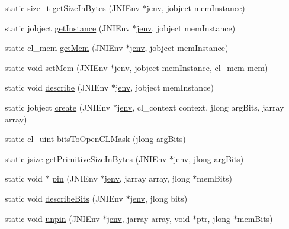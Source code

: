 \begin{DoxyCompactItemize}
\item 
static size\-\_\-t \hyperlink{class_open_c_l_mem_adf381fcc1d6d7bcf70ae8ef6ee6f7ce5}{get\-Size\-In\-Bytes} (J\-N\-I\-Env $\ast$\hyperlink{aparapi_8cpp_a31595c73e9a3750524b2ff61b5a14f96}{jenv}, jobject mem\-Instance)
\item 
static jobject \hyperlink{class_open_c_l_mem_a88763f264e09448e489865cc53492275}{get\-Instance} (J\-N\-I\-Env $\ast$\hyperlink{aparapi_8cpp_a31595c73e9a3750524b2ff61b5a14f96}{jenv}, jobject mem\-Instance)
\item 
static cl\-\_\-mem \hyperlink{class_open_c_l_mem_a1283fd523c4a944177fe61cb77d8e1c8}{get\-Mem} (J\-N\-I\-Env $\ast$\hyperlink{aparapi_8cpp_a31595c73e9a3750524b2ff61b5a14f96}{jenv}, jobject mem\-Instance)
\item 
static void \hyperlink{class_open_c_l_mem_a9fb43093c396d67bcbadbcb3d32fdb62}{set\-Mem} (J\-N\-I\-Env $\ast$\hyperlink{aparapi_8cpp_a31595c73e9a3750524b2ff61b5a14f96}{jenv}, jobject mem\-Instance, cl\-\_\-mem \hyperlink{_java_args_8h_a7cbda7d5df70386b14562f4b9ce490a8}{mem})
\item 
static void \hyperlink{class_open_c_l_mem_ac9d47eddfd8a064ae190b2c1fb3991e3}{describe} (J\-N\-I\-Env $\ast$\hyperlink{aparapi_8cpp_a31595c73e9a3750524b2ff61b5a14f96}{jenv}, jobject mem\-Instance)
\item 
static jobject \hyperlink{class_open_c_l_mem_adad92d2ccc634bed1b32a4f97052567e}{create} (J\-N\-I\-Env $\ast$\hyperlink{aparapi_8cpp_a31595c73e9a3750524b2ff61b5a14f96}{jenv}, cl\-\_\-context context, jlong arg\-Bits, jarray array)
\item 
static cl\-\_\-uint \hyperlink{class_open_c_l_mem_ac500dbd77f97d7a080c763b8d00addf4}{bits\-To\-Open\-C\-L\-Mask} (jlong arg\-Bits)
\item 
static jsize \hyperlink{class_open_c_l_mem_a0ce7d742f4e68b4bb5b77eb26c4f2ed3}{get\-Primitive\-Size\-In\-Bytes} (J\-N\-I\-Env $\ast$\hyperlink{aparapi_8cpp_a31595c73e9a3750524b2ff61b5a14f96}{jenv}, jlong arg\-Bits)
\item 
static void $\ast$ \hyperlink{class_open_c_l_mem_af6a8f1168e1cc1e590d90953950993f6}{pin} (J\-N\-I\-Env $\ast$\hyperlink{aparapi_8cpp_a31595c73e9a3750524b2ff61b5a14f96}{jenv}, jarray array, jlong $\ast$mem\-Bits)
\item 
static void \hyperlink{class_open_c_l_mem_af2b0ce99988d1fb5465c26c8086272af}{describe\-Bits} (J\-N\-I\-Env $\ast$\hyperlink{aparapi_8cpp_a31595c73e9a3750524b2ff61b5a14f96}{jenv}, jlong bits)
\item 
static void \hyperlink{class_open_c_l_mem_a7eb38125dd6c74d97e6d9e979272e07c}{unpin} (J\-N\-I\-Env $\ast$\hyperlink{aparapi_8cpp_a31595c73e9a3750524b2ff61b5a14f96}{jenv}, jarray array, void $\ast$ptr, jlong $\ast$mem\-Bits)
\end{DoxyCompactItemize}


